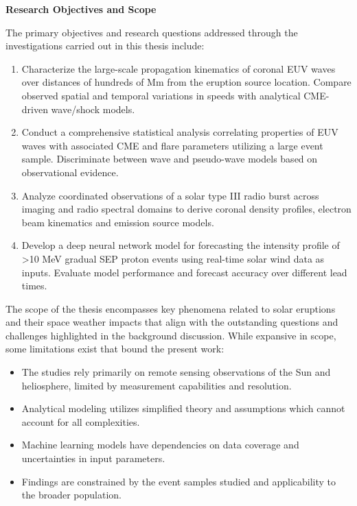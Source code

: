 \documentclass{article}
\begin{document}
\textbf{Research Objectives and Scope}

The primary objectives and research questions addressed through the investigations carried out in this thesis include:

\begin{enumerate}
    \item Characterize the large-scale propagation kinematics of coronal EUV waves over distances of hundreds of Mm from the eruption source location. Compare observed spatial and temporal variations in speeds with analytical CME-driven wave/shock models.
    \item Conduct a comprehensive statistical analysis correlating properties of EUV waves with associated CME and flare parameters utilizing a large event sample. Discriminate between wave and pseudo-wave models based on observational evidence.
    \item Analyze coordinated observations of a solar type III radio burst across imaging and radio spectral domains to derive coronal density profiles, electron beam kinematics and emission source models.
    \item Develop a deep neural network model for forecasting the intensity profile of >10 MeV gradual SEP proton events using real-time solar wind data as inputs. Evaluate model performance and forecast accuracy over different lead times.
\end{enumerate}

The scope of the thesis encompasses key phenomena related to solar eruptions and their space weather impacts that align with the outstanding questions and challenges highlighted in the background discussion. While expansive in scope, some limitations exist that bound the present work:

\begin{itemize}
    \item The studies rely primarily on remote sensing observations of the Sun and heliosphere, limited by measurement capabilities and resolution.
    \item Analytical modeling utilizes simplified theory and assumptions which cannot account for all complexities.
    \item Machine learning models have dependencies on data coverage and uncertainties in input parameters.
    \item Findings are constrained by the event samples studied and applicability to the broader population.
\end{itemize}
\end{document}
